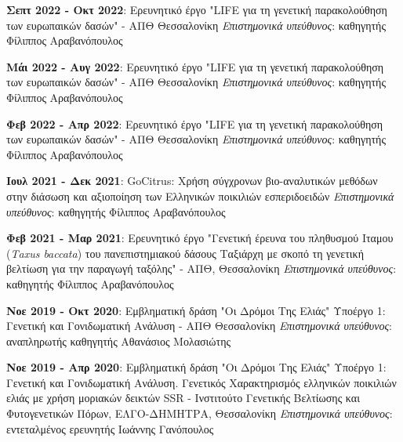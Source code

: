 \documentclass[12pt,]{scrartcl}
\begin{document}
\textbf{Σεπτ 2022 - Οκτ 2022}: Ερευνητικό έργο "LIFE για τη γενετική παρακολούθηση των ευρωπαικών δασών" - ΑΠΘ Θεσσαλονίκη
\vspace{2mm}
\newline
\textit{Επιστημονικά υπεύθυνος}: καθηγητής Φίλιππος Αραβανόπουλος

\textbf{Μάι 2022 - Αυγ 2022}: Ερευνητικό έργο "LIFE για τη γενετική παρακολούθηση των ευρωπαικών δασών" - ΑΠΘ Θεσσαλονίκη
\vspace{2mm}
\newline
\textit{Επιστημονικά υπεύθυνος}: καθηγητής Φίλιππος Αραβανόπουλος

\textbf{Φεβ 2022 - Απρ 2022}: Ερευνητικό έργο "LIFE για τη γενετική παρακολούθηση των ευρωπαικών δασών" - ΑΠΘ Θεσσαλονίκη
\vspace{2mm}
\newline
\textit{Επιστημονικά υπεύθυνος}: καθηγητής Φίλιππος Αραβανόπουλος

\textbf{Ιουλ 2021 - Δεκ 2021}: GoCitrus: Χρήση σύγχρονων βιο-αναλυτικών μεθόδων στην διάσωση και αξιοποίηση των Ελληνικών ποικιλιών εσπεριδοειδών
\vspace{2mm}
\newline
\textit{Επιστημονικά υπεύθυνος}: καθηγητής Φίλιππος Αραβανόπουλος

\textbf{Φεβ 2021 - Μαρ 2021}: Ερευνητικό έργο "Γενετική έρευνα του πληθυσμού Ιταμου (\textit{Τaxus baccata}) του πανεπιστημιακού δάσους Ταξιάρχη με σκοπό τη γενετική
βελτίωση για την παραγωγή ταξόλης" - ΑΠΘ, Θεσσαλονίκη
\vspace{2mm}
\newline
\textit{Επιστημονικά υπεύθυνος}: καθηγητής Φίλιππος Αραβανόπουλος

\textbf{Νοε 2019 - Οκτ 2020}: Εμβληματική δράση "Οι Δρόμοι Της Ελιάς" Υποέργο 1: Γενετική και Γονιδωματική Ανάλυση - ΑΠΘ Θεσσαλονίκη
\vspace{2mm}
\newline
\textit{Επιστημονικά υπεύθυνος}: αναπληρωτής καθηγητής Αθανάσιος Μολασιώτης

\textbf{Νοε 2019 - Απρ 2020}: Εμβληματική δράση "Οι Δρόμοι Της Ελιάς" Υποέργο 1: Γενετική και Γονιδωματική Ανάλυση. Γενετικός Χαρακτηρισμός ελληνικών ποικιλιών ελιάς με χρήση μοριακών δεικτών SSR - Ινστιτούτο Γενετικής Βελτίωσης και Φυτογενετικών Πόρων, ΕΛΓΟ-ΔΗΜΗΤΡΑ, Θεσσαλονίκη
\vspace{2mm}
\newline
\textit{Επιστημονικά υπεύθυνος}: εντεταλμένος ερευνητής Ιωάννης Γανόπουλος
\end{document}
